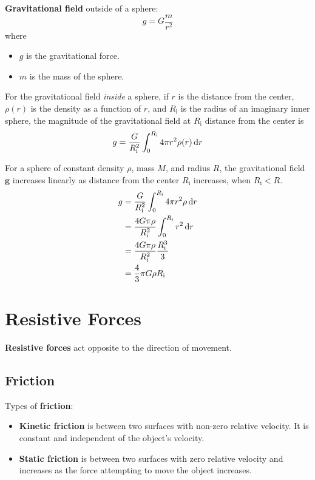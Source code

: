 \documentclass[a4paper, titlepage]{book}
\begin{document}
\textbf{Gravitational field} outside of a sphere:
\begin{equation}
    g = G \frac{m}{r^2}
\end{equation}
where
\begin{itemize}
    \item \(g\) is the gravitational force.
    \item \(m\) is the mass of the sphere.
\end{itemize}

For the gravitational field \emph{inside} a sphere,
if \(r\) is the distance from the center,
\(\rho(r)\) is the density as a function of \(r\),
and \(R_\mathrm{i}\) is the radius of an imaginary inner sphere,
the magnitude of the gravitational field at \(R_\mathrm{i}\) distance from the center is
\begin{equation}
        g = \frac{G}{R_\mathrm{i}^2} \int_{0}^{R_\mathrm{i}} 4\pi r^2 \rho(r) \odif{r}
\end{equation}

For a sphere of constant density \(\rho\), mass \(M\), and radius \(R\),
the gravitational field \(\bm{g}\) increases linearly
as distance from the center \(R_\mathrm{i}\) increases, when \(R_\mathrm{i} < R\).
\begin{equation}
    \begin{aligned}
        g &= \frac{G}{R_\mathrm{i}^2} \int_{0}^{R_\mathrm{i}} 4\pi r^2 \rho \odif{r} \\
        &= \frac{4 G \pi \rho}{R_\mathrm{i}^2} \int_{0}^{R_\mathrm{i}} r^2 \odif{r} \\
        &= \frac{4 G \pi \rho}{R_\mathrm{i}^2} \frac{R_\mathrm{i}^3}{3} \\
        &= \frac{4}{3} \pi G \rho R_\mathrm{i}
    \end{aligned}
\end{equation}

\section{Resistive Forces}

\textbf{Resistive forces} act opposite to the direction of movement.

\subsection{Friction}

Types of \textbf{friction}:
\begin{itemize}
    \item
        \textbf{Kinetic friction} is between two surfaces with non-zero relative velocity.
        It is constant and independent of the object's velocity.
    \item
        \textbf{Static friction} is between two surfaces with zero relative velocity
        and increases as the force attempting to move the object increases.
\end{itemize}
\end{document}
